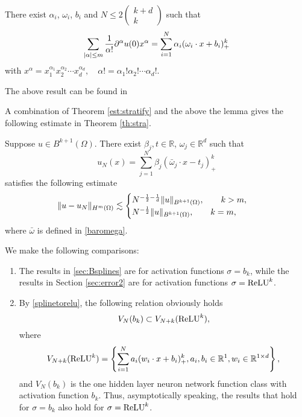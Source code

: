 \begin{lemma}
There exist $\alpha_i$, $\omega_i$, $b_i$ and $N\le 2\begin{pmatrix} k+d\\k\end{pmatrix}$
such that
$$
 \sum_{|\alpha|\le m}{1\over \alpha!} \partial^\alpha u(0) x^\alpha = \sum_{i=1}^N\alpha_i (\omega_i\cdot x + b_i)_+^k
$$ 
with $
x^\alpha = x_1^{\alpha_1}x_2^{\alpha_2}\cdots x_d^{\alpha_d},\quad \alpha!=\alpha_1!\alpha_2!\cdots \alpha_d!.
$
\end{lemma}
The above result can be found in \cite{he2020preprint}

A combination of Theorem \ref{est:stratify} and the above the lemma gives the following estimate in Theorem \ref{th:stra}.
\begin{theorem} \label{th:stra}
Suppose $u\in B^{k+1}(\Omega)$.
There exist $\beta_j, t\in \mathbb{R}$, $\omega_j \in \mathbb{R}^d$ such that 
\begin{equation}
u_N(x)= \sum_{j=1}^{N}\beta_j (\bar \omega_j\cdot x - t_j)_+^k
\end{equation} 
satisfies the following estimate
\begin{equation}\label{d}
\|u- u_N \|_{H^m(\Omega)} \lesssim 
\begin{cases}
N^{-{1\over 2}-{1\over d}}\|u\|_{B^{k+1}(\Omega)},\qquad k> m,
\\
N^{-{1\over 2}}\|u\|_{B^{k+1}(\Omega)},\qquad k= m,
\end{cases}
\end{equation} 
where $\bar\omega$ is defined in \eqref{baromega}.
\end{theorem}

\begin{remark}
We make the following comparisons:
\begin{enumerate}
\item The results in \ref{sec:Bsplines} are for activation functions $\sigma=b_k$, while the results in Section \ref{sec:error2} are for activation functions $\sigma={\rm ReLU}^k$.
\item By \eqref{splinetorelu}, the following relation obviously holds
$$
V_N(b_k)\subset V_{N+k}({\rm ReLU}^k),
$$
where 
\begin{equation}
\label{VkN}
V_{N+k}({\rm ReLU}^k)=\left\{\sum_{i=1}^Na_i(w_i\cdot x+b_i)_+^k, a_i, b_i\in\mathbb R^1, w_i\in \mathbb R^{1\times d}\right\},
\end{equation}
and $V_N(b_k)$ is the one hidden layer neuron network
function class with activation function $b_k$.  Thus, asymptotically
speaking, the results that hold for $\sigma=b_k$ also hold for
$\sigma={\rm ReLU}^k$. 
\end{enumerate}
\end{remark}






